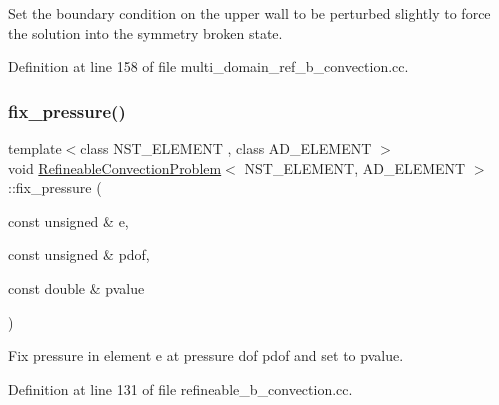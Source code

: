Set the boundary condition on the upper wall to be perturbed slightly to force the solution into the symmetry broken state. 



Definition at line 158 of file multi\+\_\+domain\+\_\+ref\+\_\+b\+\_\+convection.\+cc.

\mbox{\label{classRefineableConvectionProblem_a3432fe8f8e4ba54d5e4c1ca7b3b233e2}} 
\subsubsection{\texorpdfstring{fix\+\_\+pressure()}{fix\_pressure()}\hspace{0.1cm}{\footnotesize\ttfamily [1/2]}}
{\footnotesize\ttfamily template$<$class N\+S\+T\+\_\+\+E\+L\+E\+M\+E\+NT , class A\+D\+\_\+\+E\+L\+E\+M\+E\+NT $>$ \\
void \hyperlink{classRefineableConvectionProblem}{Refineable\+Convection\+Problem}$<$ N\+S\+T\+\_\+\+E\+L\+E\+M\+E\+NT, A\+D\+\_\+\+E\+L\+E\+M\+E\+NT $>$\+::fix\+\_\+pressure (\begin{DoxyParamCaption}\item[{const unsigned \&}]{e,  }\item[{const unsigned \&}]{pdof,  }\item[{const double \&}]{pvalue }\end{DoxyParamCaption})\hspace{0.3cm}{\ttfamily [inline]}}



Fix pressure in element e at pressure dof pdof and set to pvalue. 



Definition at line 131 of file refineable\+\_\+b\+\_\+convection.\+cc.

\mbox{\label{classRefineableConvectionProblem_a3432fe8f8e4ba54d5e4c1ca7b3b233e2}} 
